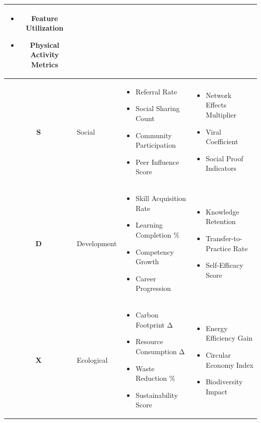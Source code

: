 \begin{table}[htbp]
\begin{tabular}{@{}clp{5cm}p{4cm}@{}}
\begin{itemize}[nosep, leftmargin=*]
\item Feature Utilization
\item Physical Activity Metrics
\end{itemize} \\
\midrule
\textbf{S} & Social &
\begin{itemize}[nosep, leftmargin=*]
\item Referral Rate
\item Social Sharing Count
\item Community Participation
\item Peer Influence Score
\end{itemize} &
\begin{itemize}[nosep, leftmargin=*]
\item Network Effects Multiplier
\item Viral Coefficient
\item Social Proof Indicators
\end{itemize} \\
\midrule
\textbf{D} & Development &
\begin{itemize}[nosep, leftmargin=*]
\item Skill Acquisition Rate
\item Learning Completion \%
\item Competency Growth
\item Career Progression
\end{itemize} &
\begin{itemize}[nosep, leftmargin=*]
\item Knowledge Retention
\item Transfer-to-Practice Rate
\item Self-Efficacy Score
\end{itemize} \\
\midrule
\textbf{X} & Ecological &
\begin{itemize}[nosep, leftmargin=*]
\item Carbon Footprint Δ
\item Resource Consumption Δ
\item Waste Reduction \%
\item Sustainability Score
\end{itemize} &
\begin{itemize}[nosep, leftmargin=*]
\item Energy Efficiency Gain
\item Circular Economy Index
\item Biodiversity Impact
\end{itemize} \\
\bottomrule
\end{tabular}
\end{table}

